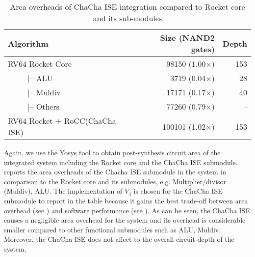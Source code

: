 \begin{table}
	\caption{Area overheads of ChaCha ISE integration compared to Rocket core and its sub-modules}
	\label{tab:res:hardcost2}
	\begin{tabular}{lrr}
		\toprule            
		Algorithm        &     Size (NAND2 gates)       & Depth \\
		
		\midrule
		RV64 Rocket Core               &    98150 (1.00$\times$)  &  153  \\
		~~~~~|-- ALU                   &     3719 (0.04$\times$)  &   28  \\
		~~~~~|-- Muldiv                &    17171 (0.17$\times$)  &   40  \\
		~~~~~|-- Others                &    77260 (0.79$\times$)  &    -  \\
		RV64 Rocket + RoCC(ChaCha ISE) &   100101 (1.02$\times$)  &  153  \\ 
		
		\bottomrule
	\end{tabular} 
\end{table}

Again, we use the Yosys tool to obtain post-synthesis circuit area of the integrated system including the Rocket core and the ChaCha ISE submodule.  reports the area overheads of the Chacha ISE submodule in the system in comparison to the Rocket core and its submodules, e.g. Multiplier/divisor (Muldiv), ALU. The implementation of $V_4$ is chosen for the ChaCha ISE submodule to report in the table because it gains the best trade-off between area overhead (see ) and software performance (see ). As can be seen, the ChaCha ISE causes a negligible area overhead for the system and its overhead is considerable smaller compared to other functional submodules such as ALU, Muldiv. Moreover, the ChaCha ISE does not affect to the overall circuit depth of the system.



